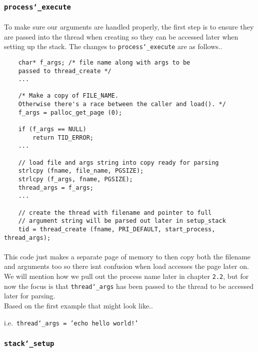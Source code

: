 \documentclass[]{article}
\begin{document}
    \subsubsection{\texttt{process\char`_execute}}
    \paragraph{}
    To make sure our arguments are handled properly, the first step is to ensure they are passed into the thread when creating so they can be accessed later when setting up the stack. The changes to \texttt{process\char`_execute} are as follows..
    \newline
    \lstset{language=C, tabsize=2}    
    \begin{lstlisting}
	char* f_args; /* file name along with args to be 
	passed to thread_create */	
	...	  

	/* Make a copy of FILE_NAME.
	Otherwise there's a race between the caller and load(). */
	f_args = palloc_get_page (0);
  	
	if (f_args == NULL)
		return TID_ERROR;	
	... 
	
	// load file and args string into copy ready for parsing  
	strlcpy (fname, file_name, PGSIZE);
	strlcpy (f_args, fname, PGSIZE);
	thread_args = f_args;		
	...
	
	// create the thread with filename and pointer to full 
	// argument string will be parsed out later in setup_stack
	tid = thread_create (fname, PRI_DEFAULT, start_process, thread_args);
  	\end{lstlisting}
  	
  	\paragraph{}
  	This code just makes a separate page of memory to then copy both the filename and arguments too so there isnt confusion when load accesses the page later on. We will mention how we pull out the process name later in chapter \texttt{2.2}, but for now the focus is that \texttt{thread\char`_args} has been passed to the thread to be accessed later for parsing.
  	\newline
  	\\
  	Based on the first example that might look like..
  	\newline
  	\\
  	\centerline{i.e.\texttt{ thread\char`_args = 'echo hello world!'}}
	
    \subsubsection{\texttt{stack\char`_setup}}
\end{document}
